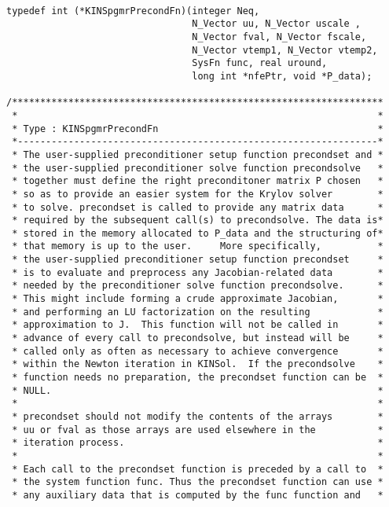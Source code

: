 \small
\begin{verbatim}

typedef int (*KINSpgmrPrecondFn)(integer Neq, 
                                 N_Vector uu, N_Vector uscale ,
                                 N_Vector fval, N_Vector fscale,
                                 N_Vector vtemp1, N_Vector vtemp2,
                                 SysFn func, real uround,
                                 long int *nfePtr, void *P_data);
  
/******************************************************************
 *                                                                *     
 * Type : KINSpgmrPrecondFn                                       *
 *----------------------------------------------------------------*
 * The user-supplied preconditioner setup function precondset and *
 * the user-supplied preconditioner solve function precondsolve   *
 * together must define the right preconditoner matrix P chosen   *
 * so as to provide an easier system for the Krylov solver        *
 * to solve. precondset is called to provide any matrix data      *
 * required by the subsequent call(s) to precondsolve. The data is*
 * stored in the memory allocated to P_data and the structuring of*
 * that memory is up to the user.     More specifically,          *
 * the user-supplied preconditioner setup function precondset     *
 * is to evaluate and preprocess any Jacobian-related data        *
 * needed by the preconditioner solve function precondsolve.      *
 * This might include forming a crude approximate Jacobian,       *
 * and performing an LU factorization on the resulting            *
 * approximation to J.  This function will not be called in       *
 * advance of every call to precondsolve, but instead will be     *
 * called only as often as necessary to achieve convergence       *
 * within the Newton iteration in KINSol.  If the precondsolve    *
 * function needs no preparation, the precondset function can be  *
 * NULL.                                                          *
 *                                                                *
 * precondset should not modify the contents of the arrays        *
 * uu or fval as those arrays are used elsewhere in the           *
 * iteration process.                                             *
 *                                                                *
 * Each call to the precondset function is preceded by a call to  *
 * the system function func. Thus the precondset function can use *
 * any auxiliary data that is computed by the func function and   *

\end{verbatim}
